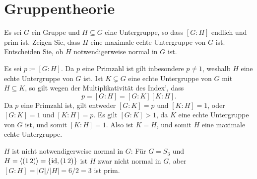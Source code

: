 \section{Gruppentheorie}


\begin{question}[subtitle = Ein Kriterium für maximale Untergruppen]
  Es sei $G$ ein Gruppe und $H \subseteq G$ eine Untergruppe, so dass $[G : H]$ endlich und prim ist.
  Zeigen Sie, dass $H$ eine maximale echte Untergruppe von $G$ ist. Entscheiden Sie, ob $H$ notwendigerweise normal in $G$ ist.
\end{question}


\begin{solution}
  Es sei $p \coloneqq [G : H]$.
  Da $p$ eine Primzahl ist gilt inbesondere $p \neq 1$, weshalb $H$ eine echte Untergruppe von $G$ ist.
  Ist $K \subsetneq G$ eine echte Untergruppe von $G$ mit $H \subseteq K$, so gilt wegen der Multiplikativität des Index’, dass 
  \[
      p
    = [G : H]
    = [G : K] [K : H].
  \]
  Da $p$ eine Primzahl ist, gilt entweder $[G : K] = p$ und $[K : H] = 1$, oder $[G : K] = 1$ und $[K : H] = p$.
  Es gilt $[G : K] > 1$, da $K$ eine echte Untergruppe von $G$ ist, und somit $[K : H] = 1$.
  Also ist $K = H$, und somit $H$ eine maximale echte Untergruppe.
  
  $H$ ist nicht notwendigerweise normal in $G$:
  Für $G = S_3$ und $H = \left\langle (1\,2) \right\rangle = \{\operatorname{id}, (1\,2)\}$ ist $H$ zwar nicht normal in $G$, aber $[G : H] = |G|/|H| = 6/2 = 3$ ist prim.
\end{solution}


